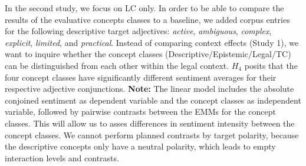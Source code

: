 \documentclass{report}
\begin{document}
In the second study, we focus on LC only. In order to be able to compare the results of the evaluative concepts classes to a baseline, we added corpus entries for the following descriptive target adjectives: \textit{active}, \textit{ambiguous}, \textit{complex}, \textit{explicit}, \textit{limited}, and \textit{practical}. Instead of comparing context effects (Study 1), we want to inquire whether the concept classes (Descriptive/Epistemic/Legal/TC) can be distinguished from each other within the legal context. $H_4$ posits that the four concept classes have significantly different sentiment averages for their respective adjective conjunctions. \textbf{Note:} The linear model includes the absolute conjoined sentiment as dependent variable and the concept classes as independent variable, followed by pairwise contrasts between the EMMs for the concept classes. This will allow us to asses differences in sentiment intensity between the concept classes. 
We cannot perform planned contrasts by target polarity, because the descriptive concepts only have a neutral polarity, which leads to empty interaction levels and contrasts.
\end{document}
